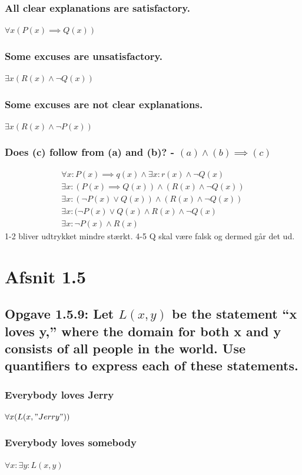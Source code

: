 \documentclass[12pt, a4paper]{report}
\begin{document}
				\subsubsection{All clear explanations are satisfactory.}
					$\forall x (P(x) \implies Q(x))$
				\subsubsection{Some excuses are unsatisfactory.}
					$\exists x( R(x) \land \neg Q(x))$
				\subsubsection{Some excuses are not clear explanations.}
					$\exists x (R(x) \land \neg P(x))$
				\subsubsection{Does (c) follow from (a) and (b)? - $(a)\land (b)\implies (c)$}
					\begin{align}
						\forall x: P(x)\implies q(x) \land \exists x : r(x) \land \neg Q(x)\\
						\exists x : (P(x)\implies Q(x))\land(R(x) \land \neg Q(x))\\
						\exists x : (\neg P(x)\lor Q(x))\land (R(x)\land \neg Q(x))\\
						\exists x : (\neg P(x)\lor Q(x)\land R(x)\land \neg Q(x)\\
						\exists x : \neg P(x)\land R(x)
					\end{align}
					1-2 bliver udtrykket mindre stærkt. 4-5 Q skal være falsk og dermed går det ud.
		\setcounter{section}{0}
		\section{Afsnit 1.5}
			\setcounter{subsection}{8}
			\subsection{Opgave 1.5.9: Let $L(x, y)$ be the statement “x loves y,” where the domain for both x and y consists of all people in the world. Use quantiﬁers to express each of these statements.}
				\subsubsection{Everybody loves Jerry}
					$\forall x (L(x,"Jerry"))$
				\subsubsection{Everybody loves somebody}
					$\forall x: \exists y: L(x,y)$
			\setcounter{subsection}{18}
\end{document}
